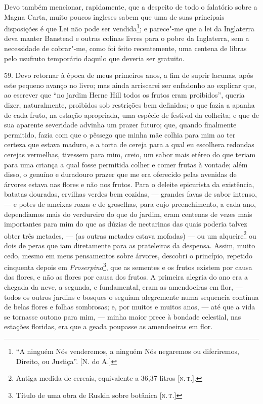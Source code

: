 Devo também mencionar, rapidamente, que a despeito de todo o falatório
sobre a Magna Carta, muito poucos ingleses sabem que uma de suas
principais disposições é que Lei não pode ser vendida\footnote{``A
  ninguém Nós venderemos, a ninguém Nós negaremos ou diferiremos,
  Direito, ou Justiça''. {[}N. do A.{]}}; e parece"-me que a lei da
Inglaterra deva manter Banstead e outras colinas livres para o pobre da
Inglaterra, sem a necessidade de cobrar"-me, como foi feito recentemente,
uma centena de libras pelo usufruto temporário daquilo que deveria ser
gratuito.

59. Devo retornar à época de meus primeiros anos, a fim de suprir
lacunas, após este pequeno avanço no livro; mas ainda arriscarei ser
enfadonho ao explicar que, ao escrever que ``no jardim Herne Hill todos
os frutos eram proibidos'', queria dizer, naturalmente, proibidos sob
restrições bem definidas; o que fazia a apanha de cada fruto, na estação
apropriada, uma espécie de festival da colheita; e que de sua aparente
severidade advinha um prazer futuro; que, quando finalmente permitido,
fazia com que o pêssego que minha mãe colhia para mim ao ter certeza que
estava maduro, e a torta de cereja para a qual eu escolhera redondas
cerejas vermelhas, tivessem para mim, creio, um sabor mais etéreo do que
teriam para uma criança a qual fosse permitida colher e comer frutas à
vontade; além disso, o genuíno e duradouro prazer que me era oferecido
pelas avenidas de árvores estava nas flores e não nos frutos. Para o
deleite epicurista da existência, batatas douradas, ervilhas verdes bem
cozidas, --- grandes favas de sabor intenso, --- e potes de ameixas roxas
e de groselhas, para cujo preenchimento, a cada ano, dependíamos mais do
verdureiro do que do jardim, eram centenas de vezes mais importantes
para mim do que as dúzias de nectarinas das quais poderia talvez obter
três metades, --- (as outras metades estava mofadas) --- ou um
alqueire\footnote{Antiga medida de cereais, equivalente a 36,37 litros
  {[}\textsc{n.\,t.}{]}.} ou dois de peras que iam diretamente para as
prateleiras da despensa. Assim, muito cedo, mesmo em meus pensamentos
sobre árvores, descobri o princípio, repetido cinquenta depois em
\emph{Proserpina}\footnote{Título de uma obra de Ruskin sobre botânica
  {[}\textsc{n.\,t.}{]}}, que as sementes e os frutos existem por causa das
flores, e não as flores por causa dos frutos. A primeira alegria do ano
era a chegada da neve, a segunda, e fundamental, eram as amendoeiras em
flor, --- todos os outros jardins e bosques o seguiam alegremente numa
sequencia contínua de belas flores e folhas sombrosas; e, por muitos e
muitos anos, --- até que a vida se tornasse outono para mim, --- minha
maior prece à bondade celestial, nas estações floridas, era que a geada
poupasse as amendoeiras em flor.

